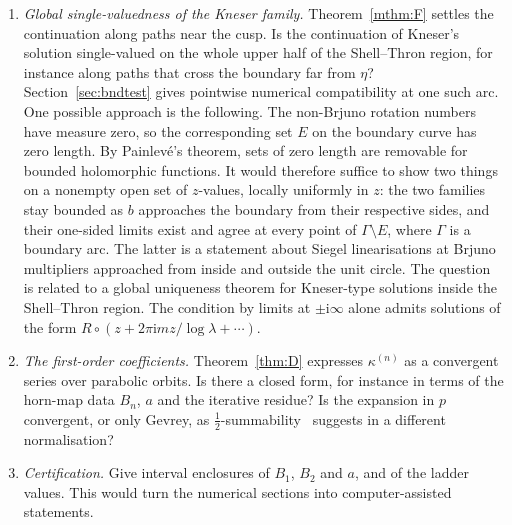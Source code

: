 \documentclass[11pt]{amsart}
\theoremstyle{definition}
\newcommand{\Rr}{R}
\newcommand{\ii}{\mathrm{i}}
\begin{document}
\begin{enumerate}
\item \emph{Global single-valuedness of the Kneser family.}  Theorem~\ref{mthm:F}
  settles the continuation along paths near the cusp.  Is the continuation of
  Kneser's solution single-valued on the whole upper half of the Shell--Thron
  region, for instance along paths that cross the boundary far from $\eta$?
  Section~\ref{sec:bndtest} gives pointwise numerical compatibility at one such
  arc.  One possible approach is the following.  The
  non-Brjuno rotation numbers have measure zero, so the corresponding set $E$
  on the boundary curve has zero length.  By Painlevé's theorem, sets of zero
  length are removable for bounded holomorphic functions.  It would therefore
  suffice to show two things on a nonempty open set of $z$-values, locally
  uniformly in $z$: the two families stay bounded as $b$ approaches the
  boundary from their respective sides, and their one-sided limits exist and
  agree at every point of $\Gamma\setminus E$, where $\Gamma$ is a boundary arc.  The
  latter is a statement about Siegel linearisations at Brjuno multipliers
  approached from inside and outside the unit circle.  The question is related to a global uniqueness
  theorem for
  Kneser-type solutions inside the Shell--Thron region.  The condition by limits
  at $\pm\ii\infty$ alone admits solutions of the form
  $\Rr\circ(z+2\pi\ii mz/\log\lambda+\cdots)$.
\item \emph{The first-order coefficients.}  Theorem~\ref{thm:D} expresses
  $\kappa^{(n)}$ as a convergent series over parabolic orbits.  Is there a closed
  form, for instance in terms of the horn-map data $B_n$, $a$ and the iterative
  residue?  Is the expansion in $p$ convergent, or only Gevrey, as
  $\tfrac12$-summability~\cite{ChristopherRousseau} suggests in a different
  normalisation?
\item \emph{Certification.}  Give interval enclosures of $B_1$, $B_2$ and $a$,
  and of the ladder values.  This would turn the numerical sections into
  computer-assisted statements.
\end{enumerate}
\end{document}
